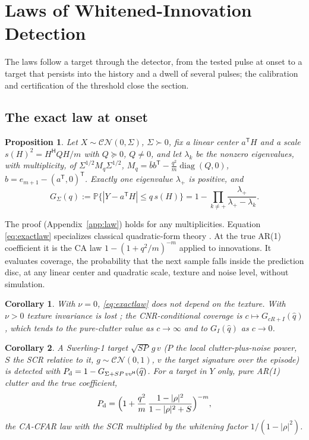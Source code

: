 \documentclass[journal]{IEEEtran}
\newtheorem{proposition}{Proposition}
\newtheorem{corollary}{Corollary}
\newcommand{\PP}{\mathbb{P}}
\begin{document}
\section{Laws of Whitened-Innovation Detection}\label{sec:laws}
The laws follow a target through the detector, from the tested pulse at onset to a target that persists into the history and a dwell of several pulses; the calibration and certification of the threshold close the section.

\subsection{The exact law at onset}\label{sec:onsetlaws}
\begin{proposition}\label{prop:law}
Let $X\sim\mathcal{CN}(0,\Sigma)$, $\Sigma\succ0$, fix a linear center $a^{\mathsf T}H$ and a scale $s(H)^2=H^{\mathsf H}QH/m$ with $Q\succeq0$, $Q\ne0$, and let $\lambda_k$ be the nonzero eigenvalues, with multiplicity, of $\Sigma^{1/2}M_q\Sigma^{1/2}$, $M_q=\bar bb^{\mathsf T}-\frac{q^2}{m}\operatorname{diag}(Q,0)$, $b=e_{m+1}-(a^{\mathsf T},0)^{\mathsf T}$. Exactly one eigenvalue $\lambda_+$ is positive, and
\begin{equation}
G_\Sigma(q):=\PP\{|Y-a^{\mathsf T}H|\le q\,s(H)\}=1-\prod_{k\ne+}\frac{\lambda_+}{\lambda_+-\lambda_k}.
\label{eq:exactlaw}
\end{equation}
\end{proposition}
The proof (Appendix~\ref{app:law}) holds for any multiplicities. Equation \eqref{eq:exactlaw} specializes classical quadratic-form theory \cite{imhof1961}. At the true AR(1) coefficient it is the CA law $1-(1+q^2/m)^{-m}$ \cite{finn1968,gandhi1988} applied to innovations. It evaluates coverage, the probability that the next sample falls inside the prediction disc, at any linear center and quadratic scale, texture and noise level, without simulation.
\begin{corollary}\label{cor:texture}
With $\nu=0$, \eqref{eq:exactlaw} does not depend on the texture. With $\nu>0$ texture invariance is lost \cite{gini1997,watts1987}; the CNR-conditional coverage is $c\mapsto G_{cR+I}(\widehat q)$, which tends to the pure-clutter value as $c\to\infty$ and to $G_I(\widehat q)$ as $c\to0$.
\end{corollary}
\begin{corollary}\label{cor:detect}
A Swerling-1 target $\sqrt{SP}\,g\,v$ ($P$ the local clutter-plus-noise power, $S$ the SCR relative to it, $g\sim\mathcal{CN}(0,1)$, $v$ the target signature over the episode) is detected with $P_{\rm d}=1-G_{\Sigma+SP\,vv^{\mathsf H}}(\widehat q)$. For a target in $Y$ only, pure AR(1) clutter and the true coefficient,
\begin{equation}
P_{\rm d}=\Big(1+\frac{q^2}{m}\,\frac{1-|\rho|^2}{1-|\rho|^2+S}\Big)^{-m},
\label{eq:pdclosed}
\end{equation}
the CA-CFAR law with the SCR multiplied by the whitening factor $1/(1-|\rho|^2)$.
\end{corollary}
\end{document}
